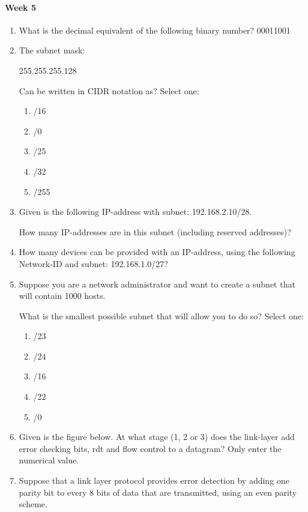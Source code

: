 \paragraph{Week 5}
\begin{enumerate}
    \item What is the decimal equivalent of the following binary number?
    00011001
    \item The subnet mask:

    255.255.255.128

    Can be written in CIDR notation as?
    Select one:
    \begin{enumerate}
        \item/16
        \item/0
        \item/25
        \item/32
        \item/255
    \end{enumerate}

    \item Given is the following IP-address with subnet: 192.168.2.10/28.

    How many IP-addresses are in this subnet (including reserved addresses)?
    \item How many devices can be provided with an IP-address, using the following Network-ID and subnet: 192.168.1.0/27?

    \item Suppose you are a network administrator and want to create a subnet that will contain 1000 hosts.

    What is the smallest possible subnet that will allow you to do so?
    Select one:
    \begin{enumerate}
        \item /23
        \item /24
        \item /16
        \item /22
        \item /0
    \end{enumerate}
    \item Given is the figure below. At what stage (1, 2 or 3) does the link-layer add error checking bits, rdt and flow control to a datagram? Only enter the numerical value.
    \item Suppose that a link layer protocol provides error detection by adding one parity bit to every 8 bits of data that are transmitted, using an even parity scheme.


\end{enumerate}
